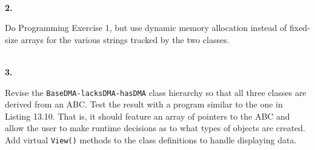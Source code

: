 \documentclass[10 pt]{amsart}
\newlength{\cwidth}
\newenvironment{cpart}[2][\cwidth]
	{%
		\\ %
		\textbf{#2. }%
		\begin{minipage}[t]{#1}%
		\setlength{\parindent}{0pt}%
		\setlength{\parskip}{2ex}%
	}
	{%
		\end{minipage}%
	}
\newcommand{\ttt}[1]{\texttt{#1}}
\begin{document}
	\begin{cpart}{2}
		Do Programming Exercise 1, but use dynamic memory allocation
		instead of fixed-size arrays for the various strings
		tracked by the two classes.
	\end{cpart}

	\begin{cpart}{3}
		Revise the \ttt{BaseDMA-lacksDMA-hasDMA} class hierarchy so that
		all three classes are derived from an ABC.
		Test the result with a program similar to the one in 
		Listing 13.10.
		That is, it should feature an array of pointers to the ABC
		and allow the user to make runtime decisions as to what
		types of objects are created.
		Add virtual \ttt{View()} methods to the class definitions
		to handle displaying data.
	\end{cpart}
\end{document}
